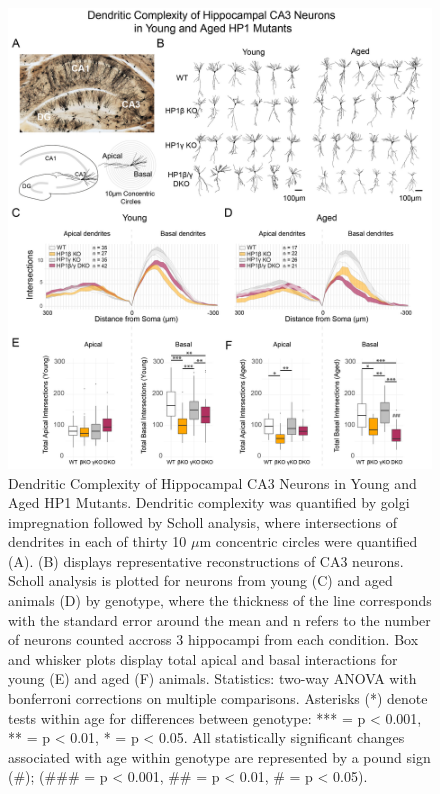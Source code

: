 \documentclass[onehalf,12pt]{beavtex}
\begin{document}
  \begin{figure}
  
  {\centering \includegraphics[width=1\linewidth, ]{./figure/results/golgiCA3quant5} 
  
  }
  
  \caption[Dendritic Complexity of Hippocampal CA3 Neurons in Young and Aged HP1 Mutants]{Dendritic Complexity of Hippocampal CA3 Neurons in Young and Aged HP1 Mutants.  Dendritic complexity was quantified by golgi impregnation followed by Scholl analysis, where intersections of dendrites in each of thirty 10 $\mu$m concentric circles were quantified (A).  (B) displays representative reconstructions of CA3 neurons.  Scholl analysis is plotted for neurons from young (C) and aged animals (D) by genotype, where the thickness of the line corresponds with the standard error around the mean and n refers to the number of neurons counted accross 3 hippocampi from each condition.  Box and whisker plots display total apical and basal interactions for young (E) and aged (F) animals. Statistics: two-way ANOVA with bonferroni corrections on multiple comparisons. Asterisks (*) denote tests within age for differences between genotype: *** = p < 0.001, ** = p < 0.01, * = p < 0.05. All statistically significant changes associated with age within genotype are represented by a pound sign (\#); (\#\#\# = p < 0.001, \#\# = p < 0.01, \# = p < 0.05).}\label{fig:golgiquant}
  \end{figure}
  
\end{document}
